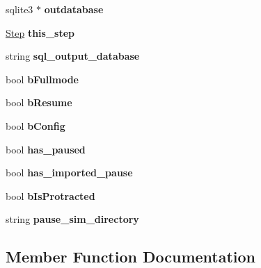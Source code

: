 \begin{DoxyCompactItemize}
\item 
sqlite3 $\ast$ {\bfseries outdatabase}\hypertarget{class_tree_afd585c8a4bdb86461780418f7b886abd}{}\label{class_tree_afd585c8a4bdb86461780418f7b886abd}

\item 
\hyperlink{struct_step}{Step} {\bfseries this\+\_\+step}\hypertarget{class_tree_af7de4d4f04360edcbe2a20db882b1f87}{}\label{class_tree_af7de4d4f04360edcbe2a20db882b1f87}

\item 
string {\bfseries sql\+\_\+output\+\_\+database}\hypertarget{class_tree_a80d3e92108eb472df49640a661ef4f7d}{}\label{class_tree_a80d3e92108eb472df49640a661ef4f7d}

\item 
bool {\bfseries b\+Fullmode}\hypertarget{class_tree_a9379466b9fc0f25bd28543743000e700}{}\label{class_tree_a9379466b9fc0f25bd28543743000e700}

\item 
bool {\bfseries b\+Resume}\hypertarget{class_tree_ac9cbd7d17fb511c1fcc70c765f6440b0}{}\label{class_tree_ac9cbd7d17fb511c1fcc70c765f6440b0}

\item 
bool {\bfseries b\+Config}\hypertarget{class_tree_a6c8c76aec6a9faef9c38f4f275b0793d}{}\label{class_tree_a6c8c76aec6a9faef9c38f4f275b0793d}

\item 
bool {\bfseries has\+\_\+paused}\hypertarget{class_tree_aaa64e29ab7bc3c6f48d454063f0c39e1}{}\label{class_tree_aaa64e29ab7bc3c6f48d454063f0c39e1}

\item 
bool {\bfseries has\+\_\+imported\+\_\+pause}\hypertarget{class_tree_ad8d1d7e4fa673b28542ba31c5b637856}{}\label{class_tree_ad8d1d7e4fa673b28542ba31c5b637856}

\item 
bool {\bfseries b\+Is\+Protracted}\hypertarget{class_tree_a1f7515f16d99a9748ab2c4c667f1ffc4}{}\label{class_tree_a1f7515f16d99a9748ab2c4c667f1ffc4}

\item 
string {\bfseries pause\+\_\+sim\+\_\+directory}\hypertarget{class_tree_a504a4d7ae23146fd6236baa59da51a6e}{}\label{class_tree_a504a4d7ae23146fd6236baa59da51a6e}

\end{DoxyCompactItemize}


\subsection{Member Function Documentation}
